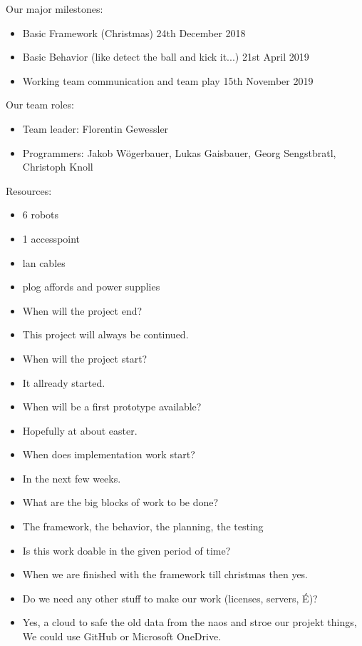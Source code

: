 \documentclass[12pt]{article}
\theoremstyle{definition}
\begin{document}
Our major milestones:\newline
\begin{itemize}
\item Basic Framework (Christmas)  24th December 2018
\item Basic Behavior (like detect the ball and kick it...)   21st April 2019
\item Working team communication and team play		15th November 2019
\end{itemize}


Our team roles:
\begin{itemize}
\item Team leader:	Florentin Gewessler
\item Programmers:	Jakob Wögerbauer, Lukas Gaisbauer, Georg Sengstbratl, Christoph Knoll
\end{itemize}

\pagebreak

Resources:
\begin{itemize}
\item 6 robots
\item 1 accesspoint
\item lan cables
\item plog affords and power supplies
\end{itemize}


\begin{itemize}
\item When will the project end?
\item This project will always be continued.
\item When will the project start?
\item It allready started.
\item When will be a first prototype available?
\item Hopefully at about easter.
\item When does implementation work start?
\item In the next few weeks.
\item What are the big blocks of work to be done?
\item The framework, the behavior, the planning, the testing
\item Is this work doable in the given period of time?
\item When we are finished with the framework till christmas then yes.
\item Do we need any other stuff to make our work (licenses, servers, É)?
\item Yes, a cloud to safe the old data from the naos and stroe our projekt things, We could use GitHub or Microsoft OneDrive.
\end{itemize}
\end{document}
